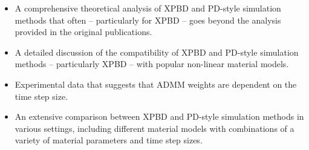 \begin{itemize}
    \item A comprehensive theoretical analysis of XPBD and PD-style simulation methods that often -- particularly for XPBD -- goes beyond the 
    analysis provided in the original publications. 
    \item A detailed discussion of the compatibility of XPBD and PD-style simulation methods -- particularly XPBD -- with popular non-linear 
    material models.
    \item Experimental data that suggests that ADMM weights are dependent on the time step size.
    \item An extensive comparison between XPBD and PD-style simulation methods in various settings, including different material models with 
    combinations of a variety of material parameters and time step sizes.
\end{itemize}
